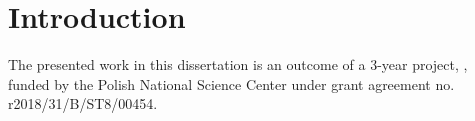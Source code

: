 

\chapter[Introduction]{Introduction}
\label{ch1}

The presented work in this dissertation is an outcome of a 3-year project, 
,  funded by the Polish National Science Center under grant agreement no. r2018/31/B/ST8/00454.
 
 
 



%
%
